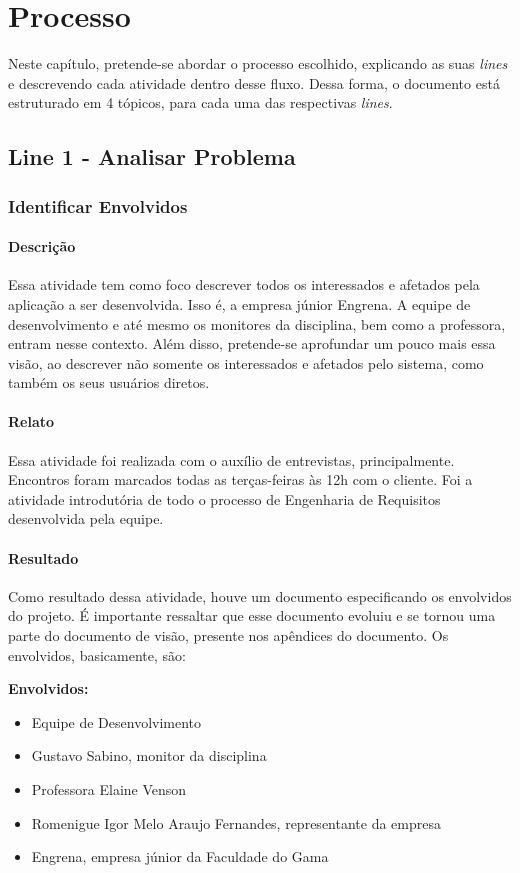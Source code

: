 \chapter{Processo}

Neste capítulo, pretende-se abordar o processo escolhido, explicando as suas \textit{lines} e descrevendo cada atividade dentro desse fluxo. Dessa forma, o documento está estruturado em 4 tópicos, para cada uma das respectivas \textit{lines}.

\section{Line 1 - Analisar Problema}

\subsection{Identificar Envolvidos}
\subsubsection{Descrição}
  Essa atividade tem como foco descrever todos os interessados e afetados pela aplicação a ser desenvolvida. Isso é, a empresa júnior Engrena. A equipe de desenvolvimento e até mesmo os monitores da disciplina, bem como a professora, entram nesse contexto.
  Além disso, pretende-se aprofundar um pouco mais essa visão, ao descrever não somente os interessados e afetados pelo sistema, como também os seus usuários diretos.

\subsubsection{Relato}
  Essa atividade foi realizada com o auxílio de entrevistas, principalmente. Encontros foram marcados todas as terças-feiras às 12h com o cliente. Foi a atividade introdutória de todo o processo de Engenharia de Requisitos desenvolvida pela equipe.

\subsubsection{Resultado}
  Como resultado dessa atividade, houve um documento especificando os envolvidos do projeto. É importante ressaltar que esse documento evoluiu e se tornou uma parte do documento de visão, presente nos apêndices do documento. Os envolvidos, basicamente, são:

\textbf{Envolvidos:}
  \begin{itemize}
  \item Equipe de Desenvolvimento
  \item Gustavo Sabino, monitor da disciplina
  \item Professora Elaine Venson
  \item Romenigue Igor Melo Araujo Fernandes, representante da empresa
  \item Engrena, empresa júnior da Faculdade do Gama
  \end{itemize}

